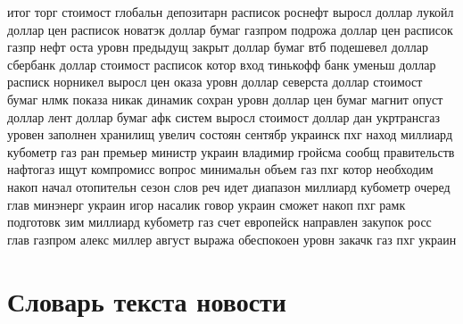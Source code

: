 \documentclass[14pt]{matmex-diploma-custom}
\begin{document}
\begin{appendices}
\noindent
итог торг стоимост глобальн депозитарн расписок роснефт выросл доллар лукойл доллар цен расписок новатэк доллар бумаг газпром подрожа доллар цен расписок газпр нефт оста уровн предыдущ закрыт доллар бумаг втб подешевел доллар сбербанк доллар стоимост расписок котор вход тинькофф банк уменьш доллар расписк норникел выросл цен оказа уровн доллар северста доллар стоимост бумаг нлмк показа никак динамик сохран уровн доллар цен бумаг магнит опуст доллар лент доллар бумаг афк систем выросл стоимост доллар дан укртрансгаз уровен заполнен хранилищ увелич состоян сентябр украинск пхг наход миллиард кубометр газ ран премьер министр украин владимир гройсма сообщ правительств нафтогаз ищут компромисс вопрос минимальн объем газ пхг котор необходим накоп начал отопительн сезон слов реч идет диапазон миллиард кубометр очеред глав минэнерг украин игор насалик говор украин сможет накоп пхг рамк подготовк зим миллиард кубометр газ счет европейск направлен закупок росс глав газпром алекс миллер август выража обеспокоен уровн закачк газ пхг украин

\section{Словарь текста новости}

\label{app:dict}


\end{appendices}
\end{document}
